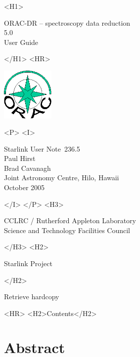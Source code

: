 \documentclass[twoside,11pt]{article}
\newcommand{\stardoccategory}  {Starlink User Note}
\newcommand{\stardocsource}    {sun\stardocnumber}
\newcommand{\stardocnumber}    {236.5}
\newcommand{\stardocauthors}   {Paul Hirst \\ Brad Cavanagh \\
                                Joint Astronomy Centre, Hilo, Hawaii}
\newcommand{\stardocdate}      {October 2005}
\newcommand{\stardoctitle}     {ORAC-DR -- spectroscopy data reduction}
\newcommand{\stardocversion}   {5.0}
\newcommand{\stardocmanual}    {User Guide}
\newcommand{\htmladdnormallink}[2]{#1}
\newcommand{\htmladdimg}[1]{}
\newcommand{\htmlref}[2]{#1}
\newcommand{\htmladdtonavigation}[1]{}
\newcommand{\xlabel}[1]{}
\renewcommand{\_}{\texttt{\symbol{95}}}
\begin{document}
\begin{htmlonly}
   \xlabel{}
   \begin{rawhtml} <H1> \end{rawhtml}
      \stardoctitle\\
      \stardocversion\\
      \stardocmanual
   \begin{rawhtml} </H1> <HR> \end{rawhtml}

\includegraphics[width=1.0in]{sun236_logo}

   \begin{rawhtml} <P> <I> \end{rawhtml}
   \stardoccategory\ \stardocnumber \\
   \stardocauthors \\
   \stardocdate
   \begin{rawhtml} </I> </P> <H3> \end{rawhtml}
      \htmladdnormallink{CCLRC / Rutherford Appleton Laboratory}
                        {http://www.cclrc.ac.uk} \\
      \htmladdnormallink{Science and Technology Facilities Council}
                        {http://www.stfc.ac.uk} \\
   \begin{rawhtml} </H3> <H2> \end{rawhtml}
      \htmladdnormallink{Starlink Project}{http://www.starlink.ac.uk/}
   \begin{rawhtml} </H2> \end{rawhtml}
   \htmladdnormallink{\htmladdimg{source.gif} Retrieve hardcopy}
      {http://www.starlink.ac.uk/cgi-bin/hcserver?\stardocsource}\\

  \label{stardoccontents}
  \begin{rawhtml}
    <HR>
    <H2>Contents</H2>
  \end{rawhtml}
  \htmladdtonavigation{\htmlref{\htmladdimg{contents_motif.gif}}
        {stardoccontents}}

  \section{\xlabel{abstract}Abstract}
\end{htmlonly}
\end{document}
